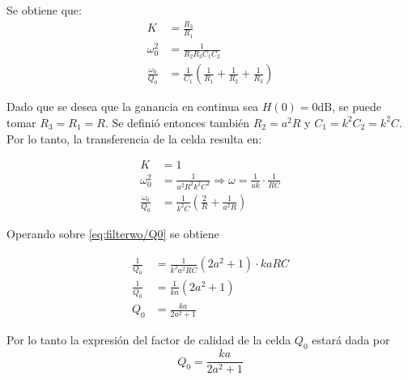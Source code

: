 Se obtiene que:
\begin{align}
    K   &=  \frac{R_3}{R_1}\\
    \omega_0^2  &=  \frac{1}{R_2 R_3 C_1 C_2}\\
    \frac{\omega_0}{Q_0}    &=  \frac{1}{C_1}\left(\frac{1}{R_1}+\frac{1}{R_2}+\frac{1}{R_3}\right)
\end{align}

Dado que se desea que la ganancia en continua sea $H(0)=0\si{\deci\bel}$, se puede tomar $R_3 = R_1 = R$. Se definió entonces también $R_2=a^2R$ y $C_1 = k^2 C_2 = k^2 C$. Por lo tanto, la transferencia de la celda resulta en:

\begin{align}
    K&=1\\
    \omega_0^2&=\frac{1}{a^2 R^2 k^2 C^2} \Rightarrow \omega =\frac{1}{ak}\cdot\frac{1}{R C}\\
    \frac{\omega_0}{Q_0} &= \frac{1}{k^2 C} \left(\frac{2}{R}+\frac{1}{a^2 R}\right) \label{eq:filterwo/Q0}
\end{align}

Operando sobre \eqref{eq:filterwo/Q0} se obtiene

\begin{align*}
    \frac{1}{Q_0} &= \frac{1}{k^2 a^2 RC}\left(2 a^2 + 1 \right)\cdot kaRC\\
    \frac{1}{Q_0} &= \frac{1}{ka} \left(2a^2+1\right)\\
    Q_0 &= \frac{ka}{2a^2+1}
\end{align*}

Por lo tanto la expresión del factor de calidad de la celda $Q_0$ estará dada por
\begin{equation}
    Q_0 = \frac{ka}{2a^2+1}
\end{equation}